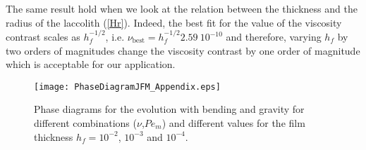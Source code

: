 The  same  result hold  when  we  look  at  the relation  between  the
thickness and the radius of the laccolith (\ref{Hr}). Indeed, the best
fit for  the value of  the viscosity contrast scales  as $h_f^{-1/2}$,
i.e.    $\nu_{\text{best}}=h_f^{-1/2}2.59~10^{-10}$   and   therefore,
varying  $h_f$  by  two  orders of  magnitudes  change  the  viscosity
contrast  by  one order  of  magnitude  which  is acceptable  for  our
application.

\begin{figure}
  \begin{center}
    \graphicspath{ {/Users/thorey/Documents/These/Projet/Refroidissement/Skin_Model/Figure/JFM_V13/} }
    \texttt{[image: PhaseDiagramJFM\_Appendix.eps]}
    \caption{Phase diagrams for the evolution with bending and gravity
      for different  combinations ($\nu$,$Pe_m$) and  different values
      for  the   film  thickness   $h_f  =  10^{-2}$,   $10^{-3}$  and
      $10^{-4}$.}
    \label{PhaseDiagramJFM_Appendix}
  \end{center}
\end{figure}






